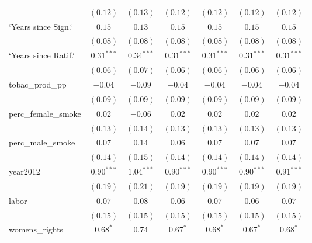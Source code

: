 \begin{table}[!h]
\begin{center}
\begin{tabular}{l c c c c c c }
                        & $(0.12)$      & $(0.13)$      & $(0.12)$      & $(0.12)$      & $(0.12)$      & $(0.12)$      \\
`Years since Sign.`     & $0.15$        & $0.13$        & $0.15$        & $0.15$        & $0.15$        & $0.15$        \\
                        & $(0.08)$      & $(0.08)$      & $(0.08)$      & $(0.08)$      & $(0.08)$      & $(0.08)$      \\
`Years since Ratif.`    & $0.31^{***}$  & $0.34^{***}$  & $0.31^{***}$  & $0.31^{***}$  & $0.31^{***}$  & $0.31^{***}$  \\
                        & $(0.06)$      & $(0.07)$      & $(0.06)$      & $(0.06)$      & $(0.06)$      & $(0.06)$      \\
tobac\_prod\_pp         & $-0.04$       & $-0.09$       & $-0.04$       & $-0.04$       & $-0.04$       & $-0.04$       \\
                        & $(0.09)$      & $(0.09)$      & $(0.09)$      & $(0.09)$      & $(0.09)$      & $(0.09)$      \\
perc\_female\_smoke     & $0.02$        & $-0.06$       & $0.02$        & $0.02$        & $0.02$        & $0.02$        \\
                        & $(0.13)$      & $(0.14)$      & $(0.13)$      & $(0.13)$      & $(0.13)$      & $(0.13)$      \\
perc\_male\_smoke       & $0.07$        & $0.14$        & $0.06$        & $0.07$        & $0.07$        & $0.07$        \\
                        & $(0.14)$      & $(0.15)$      & $(0.14)$      & $(0.14)$      & $(0.14)$      & $(0.14)$      \\
year2012                & $0.90^{***}$  & $1.04^{***}$  & $0.90^{***}$  & $0.90^{***}$  & $0.90^{***}$  & $0.91^{***}$  \\
                        & $(0.19)$      & $(0.21)$      & $(0.19)$      & $(0.19)$      & $(0.19)$      & $(0.19)$      \\
labor                   & $0.07$        & $0.08$        & $0.06$        & $0.07$        & $0.06$        & $0.07$        \\
                        & $(0.15)$      & $(0.15)$      & $(0.15)$      & $(0.15)$      & $(0.15)$      & $(0.15)$      \\
womens\_rights          & $0.68^{*}$    & $0.74$        & $0.67^{*}$    & $0.68^{*}$    & $0.67^{*}$    & $0.68^{*}$    \\

\end{tabular}
\end{center}
\end{table}
